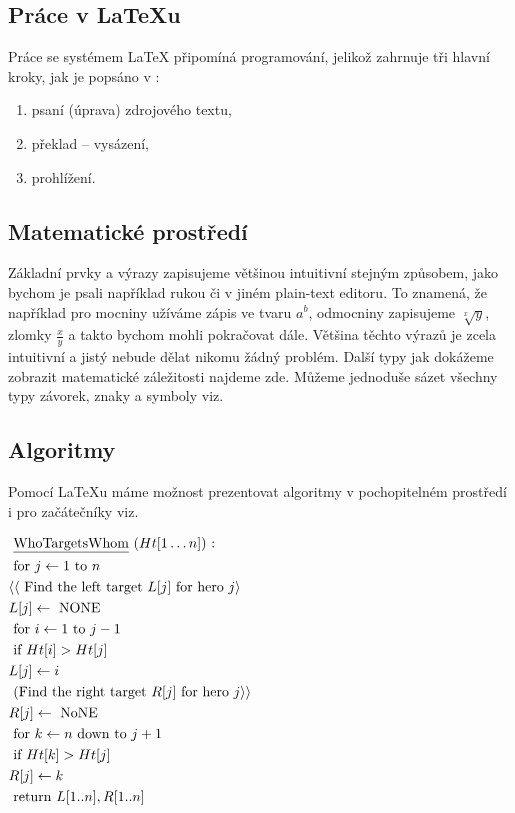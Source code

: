 \documentclass[a4paper, 11pt]{article}
\begin{document}
\subsection{Práce v \LaTeX u}

Práce se systémem \LaTeX{} připomíná programování, jelikož zahrnuje tři hlavní kroky, jak je popsáno v \cite{Rybicka2003}:
\begin{enumerate}
\item psaní (úprava) zdrojového textu,
\item překlad -- vysázení,
\item prohlížení.
\end{enumerate}

\subsection{Matematické prostředí }

Základní prvky a výrazy zapisujeme většinou intuitivní stejným způsobem,
jako bychom je psali například rukou či v jiném plain-text editoru. To znamená, že například pro mocniny užíváme zápis ve tvaru $ a ^ b$, odmocniny
zapisujeme $\sqrt[x]{y}$, zlomky $\frac{x}{y}$ a takto bychom mohli pokračovat dále. Většina těchto výrazů je zcela intuitivní a jistý nebude dělat
nikomu žádný problém. Další typy jak dokážeme zobrazit matematické záležitosti najdeme zde. \cite{Vesely2008} Můžeme jednoduše sázet všechny typy závorek, znaky a symboly viz. \cite{Olsak2014}


\subsection{Algoritmy}
Pomocí \LaTeX u máme možnost prezentovat algoritmy v pochopitelném prostředí i pro začátečníky viz. \cite{Erickson2019}
\vspace{1em}

$ \begin{aligned}
    &\text { \underline{WhoTargetsWhom} }(H t[1 \ldots n]) \text { : }\\
    &\text { for } j \leftarrow 1 \text { to } n\\
    &\langle\langle\text { Find the left target } L[j] \text { for hero } j\rangle\\
    &L[j] \leftarrow \text { NONE }\\
    &\text { for } i \leftarrow 1 \text { to } j-1\\
    &\text { if } H t[i]>H t[j]\\
    &L[j] \leftarrow i\\
    &\text { (Find the right target } R[j] \text { for hero } j\rangle\rangle\\
    &R[j] \leftarrow \text { NoNE }\\
    &\text { for } k \leftarrow n \text { down to } j+1\\
    &\text { if } H t[k]>H t[j]\\
    &R[j] \leftarrow k\\
    &\text { return } L[1 . . n], R[1 . . n]
\end{aligned} $
\end{document}
